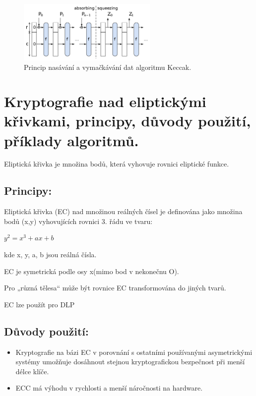 \begin{figure}
    \centering
    \includegraphics[width=0.6\textwidth]{img/sponge-construction}
    \caption{Princip nasávání a vymačkávání dat algoritmu Keccak.}
    \label{keccak}
\end{figure}


\clearpage
\section{Kryptografie nad eliptickými křivkami, principy, důvody použití, příklady algoritmů.}

Eliptická křivka je množina bodů, která vyhovuje rovnici eliptické funkce.

\subsection{Principy:}
Eliptická křivka (EC) nad množinou reálných čísel je definována jako množina bodů (x,y) vyhovujících rovnici 3. řádu ve tvaru:

\begin{center}
    $y^2=x^3+ax+b$
\end{center} 

kde x, y, a, b jsou reálná čísla.

EC je symetrická podle osy x(mimo bod v nekonečnu O).

Pro „různá tělesa“ může být rovnice EC transformována do jiných
tvarů.

EC lze použít pro DLP
\subsection{Důvody použití:}
\begin{itemize}
    \item Kryptografie na bázi EC v porovnání s ostatními používanými asymetrickými systémy umožňuje dosáhnout stejnou kryptografickou bezpečnost při menší délce klíče.
    \item ECC má výhodu v rychlosti a menší náročnosti na hardware.
\end{itemize}

